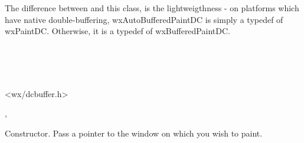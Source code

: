 The difference between  and this class,
is the lightweigthness - on platforms which have native double-buffering, wxAutoBufferedPaintDC is simply
a typedef of wxPaintDC. Otherwise, it is a typedef of wxBufferedPaintDC.



\\
\\
\\


<wx/dcbuffer.h>


,\rtfsp
{}



\label{wxautobufferedpaintdcctor}


Constructor. Pass a pointer to the window on which you wish to paint.

